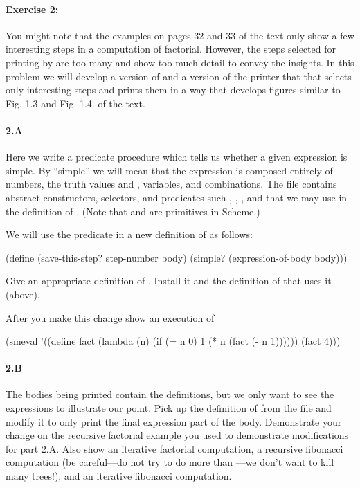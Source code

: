 \paragraph{Exercise 2:} You might note that the examples on
pages 32 and 33 of the text only show a few interesting steps in a
computation of factorial.  However, the steps selected for printing by
 are too many and show too much detail to convey the insights.
In this problem we will develop a version of 
and a version of the printer that that selects only interesting steps
and prints them in a way that develops figures similar to Fig. 1.3 and
Fig. 1.4. of the text.

\paragraph{2.A} Here we write a predicate procedure
 which tells us whether a given expression is
simple.  By ``simple'' we will mean that the expression is composed
entirely of numbers, the truth values  and ,
variables, and combinations.  The file  contains
abstract constructors, selectors, and predicates such
, , , and
 that we may use in the definition of .
(Note that  and  are primitives in
Scheme.)

We will use the  predicate in a new definition of
 as follows:

\beginlispbig
(define (save-this-step? step-number body)
  (simple? (expression-of-body body)))
\endlisp

Give an appropriate definition of .  Install it and the
definition of  that uses it (above).

After you make this change show an execution of

\beginlispbig
(smeval
  '((define fact
      (lambda (n)
        (if (= n 0)
            1
            (* n (fact (- n 1))))))
    (fact 4)))
\endlisp

\paragraph{2.B} The bodies being printed contain the definitions, but
we only want to see the expressions to illustrate our point.  Pick up
the definition of  from the file
 and modify it to only print the final expression
part of the body.  Demonstrate your change on the recursive factorial
example you used to demonstrate modifications for part 2.A.  Also show
an iterative factorial computation, a recursive
fibonacci computation (be careful---do not try to do more than
---we don't want to kill many trees!), and an iterative
fibonacci computation.


